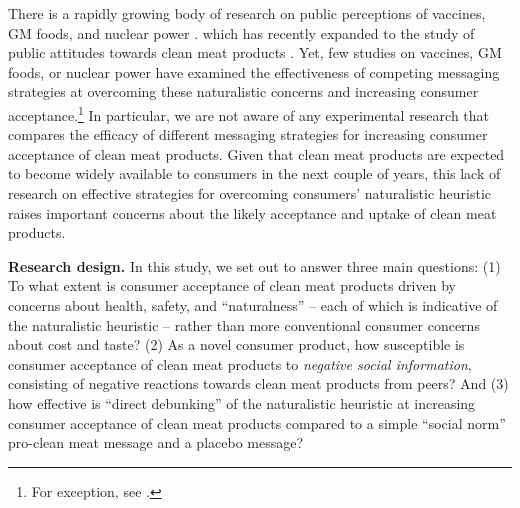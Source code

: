 \documentclass[12pt]{article}
\begin{document}
There is a rapidly growing body of research on public perceptions of vaccines, GM foods, and nuclear power \citep[see, e.g.,][]{Yaqub2014}. which has recently expanded to the study of public attitudes towards clean meat products \citep[e.g.][]{Wilks2017}. Yet, few studies on vaccines, GM foods, or nuclear power have examined the effectiveness of competing messaging strategies at overcoming these naturalistic concerns and increasing consumer acceptance.\footnote{For exception, see \citet{Nyhan2015,Nyhan2014}.} In particular, we are not aware of any experimental research that compares the efficacy of different messaging strategies for increasing consumer acceptance of clean meat products. Given that clean meat products are expected to become widely available to consumers in the next couple of years, this lack of research on effective strategies for overcoming consumers' naturalistic heuristic raises important concerns about the likely acceptance and uptake of clean meat products.





\textbf{Research design.} In this study, we set out to answer three main questions: (1) To what extent is consumer acceptance of clean meat products driven by concerns about health, safety, and ``naturalness'' -- each of which is indicative of the naturalistic heuristic -- rather than more conventional consumer concerns about cost and taste? (2) As a novel consumer product, how susceptible is consumer acceptance of clean meat products to \textit{negative social information}, consisting of negative reactions towards clean meat products from peers? And (3) how effective is ``direct debunking'' of the naturalistic heuristic at increasing consumer acceptance of clean meat products compared to a simple ``social norm'' pro-clean meat message and a placebo message?
\end{document}
